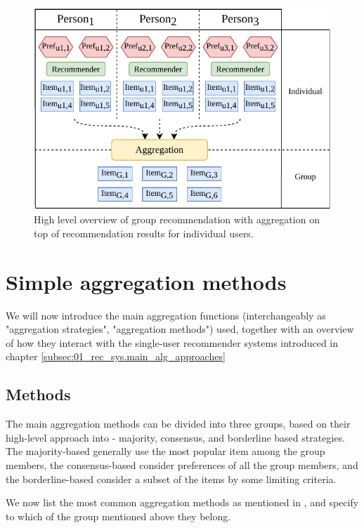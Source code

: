 \begin{figure}[htbp]
    \centering
    \includegraphics{img/after-rec-aggregation.pdf}
    \caption{High level overview of group recommendation with aggregation on top of recommendation results for individual users.}
    \label{fig:after_rec_agg}
\end{figure}






\section{Simple aggregation methods}\label{sec:03_simple_aggregation_metods}
We will now introduce the main aggregation functions (interchangeably as "aggregation strategies", "aggregation methods") used, together with an overview of how they interact with the single-user recommender systems introduced in chapter \ref{subsec:01_rec_sys.main_alg_approaches}
\subsection{Methods}\label{subsec:03_simple_aggregation_methods.methods}

The main aggregation methods can be divided into three groups, based on their high-level approach into - majority, consensus, and borderline based strategies. The majority-based generally use the most popular item among the group members, the consensus-based consider preferences of all the group members, and the borderline-based consider a subset of the items by some limiting criteria.

We now list the most common aggregation methods as mentioned in \cite{grouprecommendersystems_felfernig2018group}, \cite{masthoff_2011_group_rec_systems} and \cite{masthoff_2004_group_modeling} specify to which of the group mentioned above they belong.

